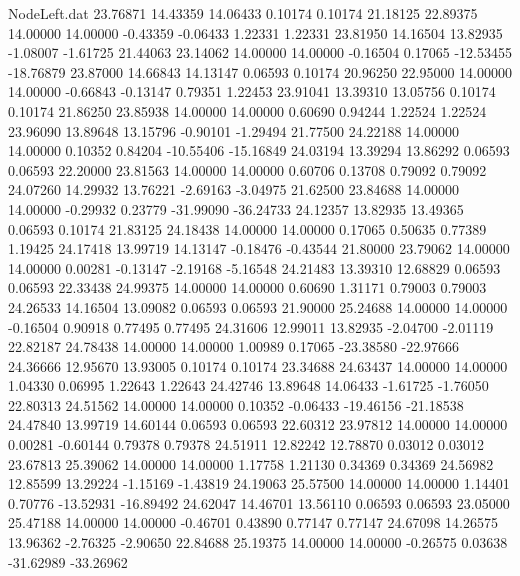 \begin{filecontents}{NodeLeft.dat}
  23.76871   14.43359   14.06433     0.10174    0.10174   21.18125   22.89375   14.00000   14.00000   -0.43359   -0.06433    1.22331    1.22331
  23.81950   14.16504   13.82935    -1.08007   -1.61725   21.44063   23.14062   14.00000   14.00000   -0.16504    0.17065  -12.53455  -18.76879
  23.87000   14.66843   14.13147     0.06593    0.10174   20.96250   22.95000   14.00000   14.00000   -0.66843   -0.13147    0.79351    1.22453
  23.91041   13.39310   13.05756     0.10174    0.10174   21.86250   23.85938   14.00000   14.00000    0.60690    0.94244    1.22524    1.22524
  23.96090   13.89648   13.15796    -0.90101   -1.29494   21.77500   24.22188   14.00000   14.00000    0.10352    0.84204  -10.55406  -15.16849
  24.03194   13.39294   13.86292     0.06593    0.06593   22.20000   23.81563   14.00000   14.00000    0.60706    0.13708    0.79092    0.79092
  24.07260   14.29932   13.76221    -2.69163   -3.04975   21.62500   23.84688   14.00000   14.00000   -0.29932    0.23779  -31.99090  -36.24733
  24.12357   13.82935   13.49365     0.06593    0.10174   21.83125   24.18438   14.00000   14.00000    0.17065    0.50635    0.77389    1.19425
  24.17418   13.99719   14.13147    -0.18476   -0.43544   21.80000   23.79062   14.00000   14.00000    0.00281   -0.13147   -2.19168   -5.16548
  24.21483   13.39310   12.68829     0.06593    0.06593   22.33438   24.99375   14.00000   14.00000    0.60690    1.31171    0.79003    0.79003
  24.26533   14.16504   13.09082     0.06593    0.06593   21.90000   25.24688   14.00000   14.00000   -0.16504    0.90918    0.77495    0.77495
  24.31606   12.99011   13.82935    -2.04700   -2.01119   22.82187   24.78438   14.00000   14.00000    1.00989    0.17065  -23.38580  -22.97666
  24.36666   12.95670   13.93005     0.10174    0.10174   23.34688   24.63437   14.00000   14.00000    1.04330    0.06995    1.22643    1.22643
  24.42746   13.89648   14.06433    -1.61725   -1.76050   22.80313   24.51562   14.00000   14.00000    0.10352   -0.06433  -19.46156  -21.18538
  24.47840   13.99719   14.60144     0.06593    0.06593   22.60312   23.97812   14.00000   14.00000    0.00281   -0.60144    0.79378    0.79378
  24.51911   12.82242   12.78870     0.03012    0.03012   23.67813   25.39062   14.00000   14.00000    1.17758    1.21130    0.34369    0.34369
  24.56982   12.85599   13.29224    -1.15169   -1.43819   24.19063   25.57500   14.00000   14.00000    1.14401    0.70776  -13.52931  -16.89492
  24.62047   14.46701   13.56110     0.06593    0.06593   23.05000   25.47188   14.00000   14.00000   -0.46701    0.43890    0.77147    0.77147
  24.67098   14.26575   13.96362    -2.76325   -2.90650   22.84688   25.19375   14.00000   14.00000   -0.26575    0.03638  -31.62989  -33.26962

\end{filecontents}
